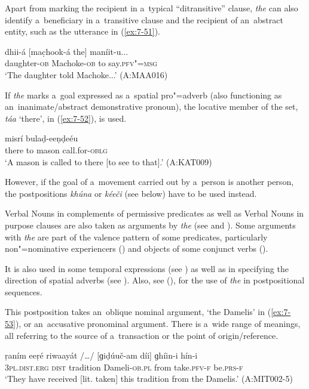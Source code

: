 Apart from marking the recipient in a~typical ``ditransitive'' clause, \textit{the} can also identify a~beneficiary in a~transitive clause and the recipient of an~abstract entity, such as the utterance in (\ref{ex:7-51}). 

\begin{exe}
\ex
\label{ex:7-51}
\gll dhii-á [mac̣hook-á the] maníit-u... \\
daughter-\textsc{ob} Machoke-\textsc{ob} to say.\textsc{pfv"=msg} \\
\glt `The daughter told Machoke...' (A:MAA016)
\end{exe}

If \textit{the} marks a~goal expressed as a~spatial pro"=adverb (also functioning as an~inanimate/abstract demonstrative pronoun), the locative member of the set, \textit{táa} `there', in (\ref{ex:7-52}), is used.

\begin{exe}
\ex
\label{ex:7-52}
 misrí bulaḍ-eeṇḍeéu \\
there to mason call.for-\textsc{oblg}\\
\glt `A mason is called to there [to see to that].' (A:KAT009)
\end{exe}

However, if the goal of a~movement carried out by a~person is another person, the postpositions \textit{khúna} or \textit{kéeči} (see below) have to be used instead.


Verbal Nouns in complements of permissive predicates as well as Verbal Nouns in purpose clauses are also taken as arguments by \textit{the} (see  and ). Some arguments with \textit{the} are part of the valence pattern of some predicates, particularly non"=nominative experiencers () and objects of some conjunct verbs (). 


It is also used in some temporal expressions (see ) as well as in specifying the direction of spatial adverbs (see ). Also, see (), for the use of \textit{the} in postpositional sequences. 


 This postposition takes an~oblique nominal argument, `the Damelis' in (\ref{ex:7-53}), or an~accusative pronominal argument. There is a~wide range of meanings, all referring to the source of a~transaction or the point of origin/reference.

\begin{exe}
\ex
\label{ex:7-53}
\gll ṛaním eeṛé riwaayát /{\ldots}/ [ɡiḍúuč-am díi]  ɡhíin-i hín-i \\
\textsc{3pl.dist.erg} \textsc{dist} tradition {} Dameli-\textsc{ob.pl} from take.\textsc{pfv-f} be.\textsc{prs-f}\\
\glt `They have received [lit. taken] this tradition from the Damelis.' (A:MIT002-5)
\end{exe}


